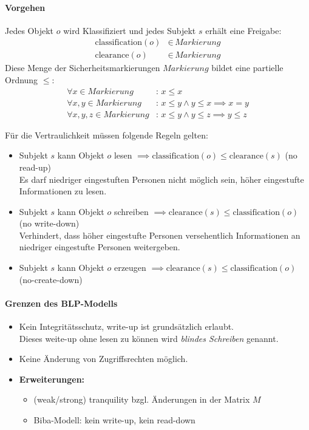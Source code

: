 			\paragraph{Vorgehen}
				Jedes Objekt \(o\) wird Klassifiziert und jedes Subjekt \(s\) erhält eine Freigabe:
				\begin{align*}
					\text{classification}(o) & \in\, \textit{Markierung} \\
					\text{clearance}(o)      & \in\, \textit{Markierung}
				\end{align*}
				Diese Menge der Sicherheitsmarkierungen \(\textit{Markierung}\) bildet eine partielle Ordnung \(\leq\):
				\begin{align*}
					\forall x \in \textit{Markierung}       & :\, x \leq x                                  \\
					\forall x, y \in \textit{Markierung}    & :\, x \leq y \land y \leq x \implies x = y    \\
					\forall x, y, z \in \textit{Markierung} & :\, x \leq y \land y \leq z \implies y \leq z
				\end{align*}

				Für die Vertraulichkeit müssen folgende Regeln gelten:
				\begin{itemize}
					\item Subjekt \(s\) kann Objekt \(o\) lesen     \tabto{6cm} \( \implies \text{classification}(o) \leq \text{clearance}(s) \) (no read-up) \\ Es darf niedriger eingestuften Personen nicht möglich sein, höher eingestufte Informationen zu lesen.
					\item Subjekt \(s\) kann Objekt \(o\) schreiben \tabto{6cm} \( \implies \text{clearance}(s) \leq \text{classification}(o) \) (no write-down) \\ Verhindert, dass höher eingestufte Personen versehentlich Informationen an niedriger eingestufte Personen weitergeben.
					\item Subjekt \(s\) kann Objekt \(o\) erzeugen  \tabto{6cm} \( \implies \text{clearance}(s) \leq \text{classification}(o) \) (no-create-down)
				\end{itemize}

			\paragraph{Grenzen des BLP-Modells}
				\begin{itemize}
					\item Kein Integritätsschutz, write-up ist grundsätzlich erlaubt. \\ Dieses weite-up ohne lesen zu können wird \textit{blindes Schreiben} genannt.
					\item Keine Änderung von Zugriffsrechten möglich.
					\item \textbf{Erweiterungen:}
						\begin{itemize}
							\item (weak/strong) tranquility bzgl. Änderungen in der Matrix \(M\)
							\item Biba-Modell: kein write-up, kein read-down
						\end{itemize}
				\end{itemize}

